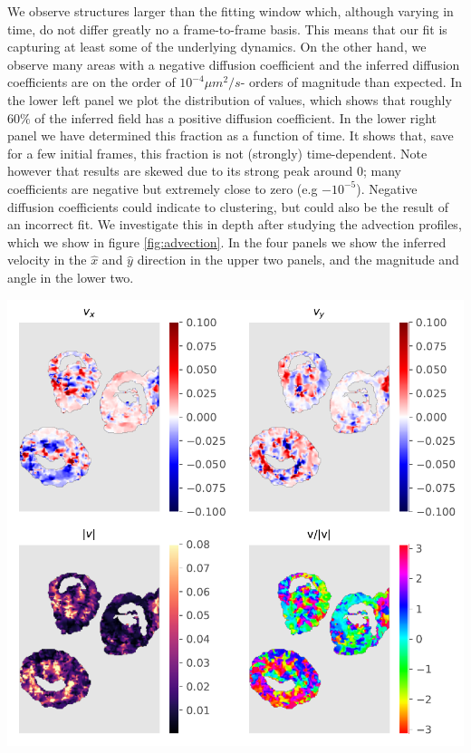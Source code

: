 \documentclass{Dissertate}
\let\origfigure\figure
\let\endorigfigure\endfigure
\renewenvironment{figure}[1][2] {
    \expandafter\origfigure\expandafter[H]
} {
    \endorigfigure
}
\begin{document}
We observe structures larger than the fitting window which, although varying in time, do not differ greatly no a frame-to-frame basis. This means that our fit is capturing at least some of the underlying dynamics. On the other hand, we observe many areas with a negative diffusion coefficient and the inferred diffusion coefficients are on the order of $10^{-4}\mu m^2/s$- orders of magnitude than expected. In the lower left panel we plot the distribution of values, which shows that roughly \(60\%\) of the inferred field has a positive diffusion coefficient. In the lower right panel we have determined this fraction as a function of time. It shows
that, save for a few initial frames, this fraction is not (strongly)
time-dependent. Note however that results are skewed due to its strong peak around 0; many coefficients are negative but extremely close to zero (e.g
\(-10^{-5}\)). Negative diffusion coefficients could indicate to clustering,
but could also be the result of an incorrect fit. We investigate this in
depth after studying the advection profiles, which we show in figure
\ref{fig:advection}. In the four panels we show the inferred
velocity in the \(\hat{x}\) and \(\hat{y}\) direction in the upper two panels, and the magnitude and angle in the lower two.

\begin{figure}
\hypertarget{fig:advection}{%
\centering
\includegraphics{source/figures/pdf/advection.pdf}
\caption{Analysis of the velocity fields. The upper rows show
respectively \(v_x\) and \(v_y\), while the lower row shows the
magnitude and angle.}\label{fig:advection}
}
\end{figure}
\end{document}
